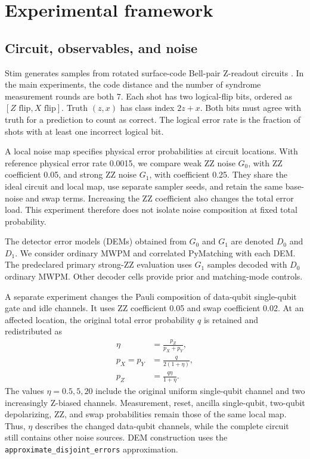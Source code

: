 \documentclass[aps,prd,12pt,twocolumn,superscriptaddress,floatfix]{revtex4-2}
\begin{document}
\section{Experimental framework}
\label{sec:framework}

\subsection{Circuit, observables, and noise}

Stim generates samples from rotated surface-code Bell-pair Z-readout circuits \cite{stim2021}. In the main experiments, the code distance and the number of syndrome measurement rounds are both 7. Each shot has two logical-flip bits, ordered as \([Z\text{ flip},X\text{ flip}]\). Truth \((z,x)\) has class index \(2z+x\). Both bits must agree with truth for a prediction to count as correct. The logical error rate is the fraction of shots with at least one incorrect logical bit.

A local noise map specifies physical error probabilities at circuit locations. With reference physical error rate 0.0015, we compare weak ZZ noise \(G_0\), with ZZ coefficient 0.05, and strong ZZ noise \(G_1\), with coefficient 0.25. They share the ideal circuit and local map, use separate sampler seeds, and retain the same base-noise and swap terms. Increasing the ZZ coefficient also changes the total error load. This experiment therefore does not isolate noise composition at fixed total probability.

The detector error models (DEMs) obtained from \(G_0\) and \(G_1\) are denoted \(D_0\) and \(D_1\). We consider ordinary MWPM and correlated PyMatching with each DEM. The predeclared primary strong-ZZ evaluation uses \(G_1\) samples decoded with \(D_0\) ordinary MWPM. Other decoder cells provide prior and matching-mode controls.

A separate experiment changes the Pauli composition of data-qubit single-qubit gate and idle channels. It uses ZZ coefficient 0.05 and swap coefficient 0.02. At an affected location, the original total error probability \(q\) is retained and redistributed as
\begin{equation}
\begin{aligned}
\eta&=\frac{p_Z}{p_X+p_Y},\\
p_X=p_Y&=\frac{q}{2(1+\eta)},\\
p_Z&=\frac{q\eta}{1+\eta}.
\end{aligned}
\label{eq:data-pauli-bias}
\end{equation}
The values \(\eta=0.5,5,20\) include the original uniform single-qubit channel and two increasingly Z-biased channels. Measurement, reset, ancilla single-qubit, two-qubit depolarizing, ZZ, and swap probabilities remain those of the same local map. Thus, \(\eta\) describes the changed data-qubit channels, while the complete circuit still contains other noise sources. DEM construction uses the \texttt{approximate\_disjoint\_errors} approximation.
\end{document}
